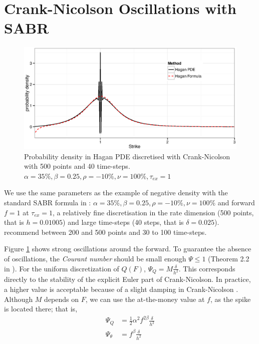\documentclass[]{rAMF2e}
\begin{document}
\section{Crank-Nicolson Oscillations with SABR}\label{section_cn}
\begin{figure}[htb]
  \begin{center}  
    \includegraphics[width=12cm]{density_hagan_cn_500_40.eps}
  \end{center}
     \caption{\label{fig:density_hagan_cn_500_40} Probability density in Hagan PDE discretised with Crank-Nicolson with 500 points and 40 time-steps. $\alpha=35\%, \beta=0.25, \rho=-10\%, \nu=100\%, \tau_{ex}=1$}
\end{figure}

We use the same parameters as the example of negative density with the standard SABR formula in \citep{hagan2013arbitrage}: $\alpha=35\%, \beta=0.25, \rho=-10\%, \nu=100\%$ and forward $f=1$ at $\tau_{ex}=1$, a relatively fine discretisation in the rate dimension (500 points, that is $h = 0.01005$) and large time-steps (40 steps, that is $\delta=0.025$). \cite{hagan2013arbitrage} recommend between 200 and 500 points and 30 to 100 time-steps.

Figure \ref{fig:density_hagan_cn_500_40} shows strong oscillations around the forward. To guarantee the absence of oscillations, the \emph{Courant number}  should be small enough $\Psi \leq 1$ (Theorem 2.2 in \cite{morton2005numerical}). For the uniform discretization of $Q(F)$, $\Psi_Q = M \frac{\delta}{h^2}$. This corresponds directly to the stability of the explicit Euler part of Crank-Nicolson. In practice, a higher value is acceptable because of a slight damping in Crank-Nicolson \citep{lawson1978extrapolation}. Although $M$ depends on $F$, we can use the at-the-money value at $f$, as the spike is located there; that is, 
\begin{align}
\Psi_Q &= \frac{1}{2} \alpha^2 f^{2\beta} \frac{\delta}{h^2} \\
\Psi_{\theta} &= f^{\beta}\frac{\delta}{h^2} 
\end{align} 
\end{document}
